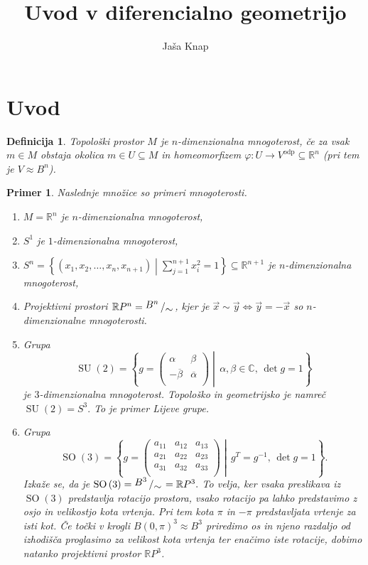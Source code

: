 \documentclass[10pt, a4paper]{article}
\newtheorem{defi}[izr]{Definicija}
\newenvironment{noticeB}{%
  \tcolorbox[%
  notitle,
  empty,
  enhanced,  %
  breakable,
  coltext=black,
  colback=white, 
  fontupper=\rmfamily,
  noparskip,
  sharp corners,
  boxrule=-1pt,  %
  frame hidden,
  left=7pt,  %
  right=7pt,
  top=5pt,
  bottom=5pt,
  before skip=2.5ex plus 2pt,
  after skip=2.5ex plus 2pt,
  borderline west = {1.5pt}{-0.1pt}{blue!30!black}, %
  overlay unbroken and last={%
    \draw[color=black, line width=1.25pt]
    ($(frame.south west)+(1.pt, -0.1pt)$) -- ++(2em, 0);
  }
  ]}
{\endtcolorbox}
\newenvironment{definicija}{\begin{noticeB}\begin{defi}}{%
\end{defi}\end{noticeB}}
\newtheorem{primer}[izr]{Primer}
\newcommand{\bigslant}[2]{{\raisebox{.2em}{$#1$}\left/\raisebox{-.2em}{$#2$}\right.}}
\begin{document}
\title{Uvod v diferencialno geometrijo}
\author{Jaša Knap}
\maketitle

\section{Uvod}%

\begin{definicija}
\label{def_mnt}
Topološki prostor $M$
je $n$-dimenzionalna mnogoterost, če za vsak $m \in M$
obstaja okolica $m \in U \subseteq M$ in homeomorfizem
$\varphi : U \to V^{\text{odp}} \subseteq
\mathbb{R}^n$ (pri tem je $V \approx B^{n}$).
\end{definicija}


\begin{primer}
Naslednje množice so primeri mnogoterosti.
\begin{enumerate}
	\item $M = \mathbb{R}^n$ je
$n$-dimenzionalna mnogoterost,
	\item $S^1$ je
$1$-dimenzionalna mnogoterost,
  \item $S^{n} =
\left\{\left( x_1, x_2, \ldots, x_n, x_{n+1}
\right) \middle| \sum_{j=1}^{n+1} x_{i}^2 =
1\right\} \subseteq \mathbb{R}^{n+1}$ je
$n$-dimenzionalna mnogoterost,
	\item Projektivni
prostori $\mathbb{R}P^{n} = \bigslant{B^{n}}{\sim} $,
kjer je $\vec{x} \sim \vec{y}  \iff \vec{y}  =
-\vec{x}$ so $n$-dimenzionalne mnogoterosti.
	\item Grupa \[ \operatorname{SU}\left( 2 \right) = \left\{ g
= \begin{pmatrix}
\alpha & \beta \\ -
\overline{\beta}  & \overline{\alpha}  \\
\end{pmatrix}
\middle|\, \alpha, \beta \in  \mathbb{C}, \, \det
g = 1 \right\} 	\]je $3$-dimenzionalna mnogoterost. Topološko in
geometrijsko je namreč $\operatorname{SU}\left( 2 \right) = S^3.$ To
je primer Lijeve grupe.
	\item Grupa \[
\operatorname{SO}\left( 3 \right) =
\left\{ g =
\begin{pmatrix} a_{11} &
a_{12} & a_{13} \\ a_{21} & a_{22}
& a_{23} \\ a_{31} & a_{32}
& a_{33} \\
\end{pmatrix}
\middle|\, g^{T} = g^{-1}, \, \det  g
= 1 \right\}. \] Izkaže se, da je
$\operatorname{SO}\left( 3\right ) =
\bigslant{B^3}{\sim } = \mathbb{R}P^3.$ To
velja, ker vsaka preslikava iz
$\operatorname{SO}\left( 3\right )$
predstavlja rotacijo prostora, vsako
rotacijo pa lahko predstavimo z osjo in
velikostjo kota vrtenja. Pri tem kota $\pi$
in $-\pi$ predstavljata vrtenje za isti
kot. Če točki v krogli $B\left( 0, \pi
\right)^{3} \approx B^3$ priredimo os in njeno
razdaljo od izhodišča proglasimo za velikost kota vrtenja
ter enačimo iste rotacije, dobimo natanko projektivni prostor
$\mathbb{R}P^3$.
\end{enumerate}
\end{primer}
\end{document}
